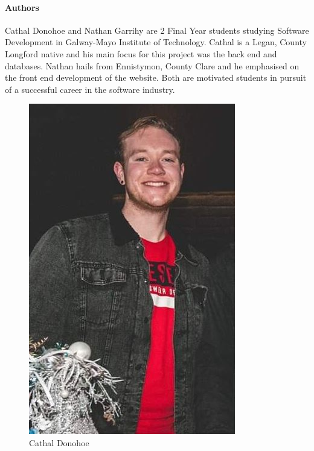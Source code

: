 \newpage
\paragraph{Authors}
Cathal Donohoe and Nathan Garrihy are 2 Final Year students studying Software Development in Galway-Mayo Institute of Technology. Cathal is a Legan, County Longford native and his main focus for this project was the back end and databases. Nathan hails from Ennistymon, County Clare and he emphasised on the front end development of the website. Both are motivated students in pursuit of a successful career in the software industry.

\begin{figure}[bh]
\renewcommand\thefigure{1.1}
\centering
\includegraphics[scale=.45]{img/CathalDonohoe.jpeg}
\caption{Cathal Donohoe}
\label{Cathal}
\end{figure}

